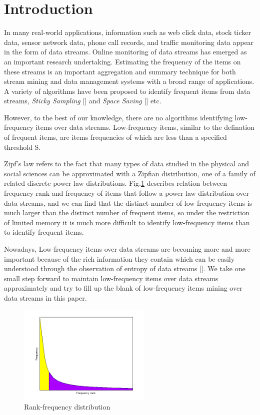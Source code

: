 \documentclass[conference]{IEEEtran}
\begin{document}
\section{Introduction}
In many real-world applications, information such as web click data, stock ticker
data, sensor network data, phone call records, and traffic monitoring data appear in the form
of data streams. Online monitoring of data streams has emerged as an important research
undertaking. Estimating the frequency of the items on these streams is an important aggregation and summary technique for both stream mining and data management systems with a broad range of applications. A variety of algorithms have been proposed to identify frequent items from data streams, \emph{Sticky Sampling} [] and \emph{Space Saving} [] etc.\par
However, to the best of our knowledge, there are no algorithms identifying low-frequency items over data streams. Low-frequency items, similar to the defination of frequent items, are items frequencies of which are less than a specified threshold S. \par
Zipf's law refers to the fact that many types of data studied in the physical and social sciences can be approximated with a Zipfian distribution, one of a family of related discrete power law distributions. Fig.\ref{fig:sim} describes relation between frequency rank and frequency of items that follow a power law distribution over data streams, and we can find that the distinct number of low-frequency items is much larger than the distinct number of frequent items, so under the restriction of limited memory it is much more difficult to identify low-frequency items than to identify frequent items. \par
Nowadays, Low-frequency items over data streams are becoming more and more important because of the rich information they contain which can be easily understood through the observation of entropy of data streams []. We take one small step forward to maintain low-frequency items over data streams approximately and try to fill up the blank of low-frequency items mining over data streams in this paper.   

\begin{figure}
	\centering
	\includegraphics[width=2.5in]{png/zipf.png}
	\caption{Rank-frequency distribution}
	\label{fig:sim}
\end{figure}
\end{document}
